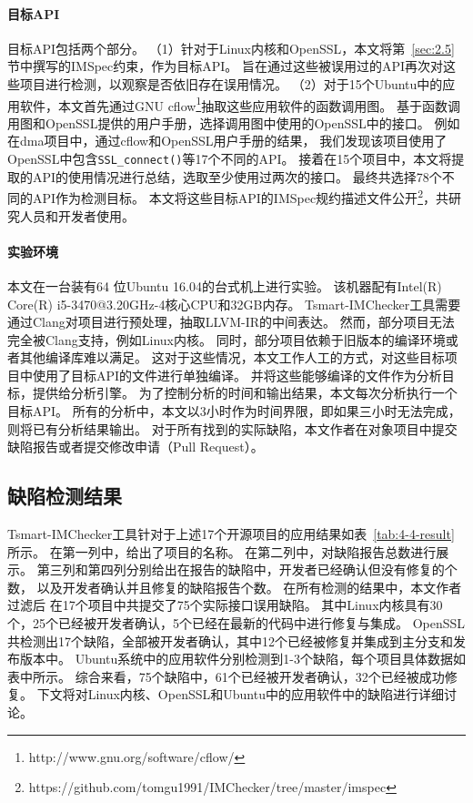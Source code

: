 \paragraph{目标API}
目标API包括两个部分。
（1）针对于Linux内核和OpenSSL，本文将第~\ref{sec:2.5}节中撰写的IMSpec约束，作为目标API。
旨在通过这些被误用过的API再次对这些项目进行检测，以观察是否依旧存在误用情况。
（2）对于15个Ubuntu中的应用软件，本文首先通过GNU cflow\footnote{http://www.gnu.org/software/cflow/}抽取这些应用软件的函数调用图。
基于函数调用图和OpenSSL提供的用户手册，选择调用图中使用的OpenSSL中的接口。
例如在dma项目中，通过cflow和OpenSSL用户手册的结果，
我们发现该项目使用了OpenSSL中包含\texttt{SSL\_connect()}等17个不同的API。
接着在15个项目中，本文将提取的API的使用情况进行总结，选取至少使用过两次的接口。
最终共选择78个不同的API作为检测目标。
本文将这些目标API的IMSpec规约描述文件公开\footnote{https://github.com/tomgu1991/IMChecker/tree/master/imspec}，共研究人员和开发者使用。

\paragraph{实验环境}
本文在一台装有64 位Ubuntu 16.04的台式机上进行实验。
该机器配有Intel(R) Core(R) i5-3470@3.20GHz-4核心CPU和32GB内存。
Tsmart-IMChecker工具需要通过Clang对项目进行预处理，抽取LLVM-IR的中间表达。
然而，部分项目无法完全被Clang支持，例如Linux内核。
同时，部分项目依赖于旧版本的编译环境或者其他编译库难以满足。
这对于这些情况，本文工作人工的方式，对这些目标项目中使用了目标API的文件进行单独编译。
并将这些能够编译的文件作为分析目标，提供给分析引擎。
为了控制分析的时间和输出结果，本文每次分析执行一个目标API。
所有的分析中，本文以3小时作为时间界限，即如果三小时无法完成，则将已有分析结果输出。
对于所有找到的实际缺陷，本文作者在对象项目中提交缺陷报告或者提交修改申请（Pull Request）。

\subsection{缺陷检测结果}

Tsmart-IMChecker工具针对于上述17个开源项目的应用结果如表~\ref{tab:4-4-result}所示。
在第一列中，给出了项目的名称。
在第二列中，对缺陷报告总数进行展示。
第三列和第四列分别给出在报告的缺陷中，开发者已经确认但没有修复的个数，
以及开发者确认并且修复的缺陷报告个数。
在所有检测的结果中，本文作者过滤后
在17个项目中共提交了75个实际接口误用缺陷。
其中Linux内核具有30个，25个已经被开发者确认，5个已经在最新的代码中进行修复与集成。
OpenSSL共检测出17个缺陷，全部被开发者确认，其中12个已经被修复并集成到主分支和发布版本中。
Ubuntu系统中的应用软件分别检测到1-3个缺陷，每个项目具体数据如表中所示。
综合来看，75个缺陷中，61个已经被开发者确认，32个已经被成功修复。
下文将对Linux内核、OpenSSL和Ubuntu中的应用软件中的缺陷进行详细讨论。

